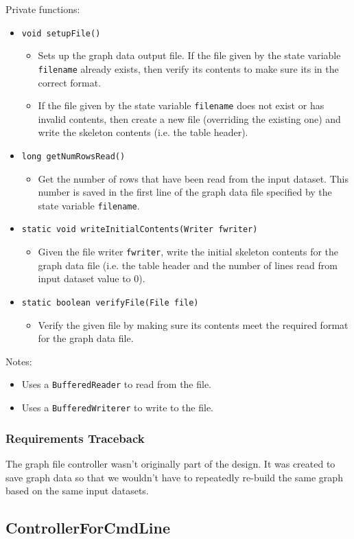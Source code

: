 \documentclass[12pt]{article}
\newcommand{\bi}{\begin{itemize}}
\newcommand{\ei}{\end{itemize}}
\newcommand{\code}[1]{\texttt{#1}}
\begin{document}
\noindent Private functions:
\bi
	\item \code{void setupFile()}
	\bi
		\item Sets up the graph data output file. If the file given by the state variable \code{filename} already exists, then verify its contents to make sure its in the correct format.
		\item If the file given by the state variable \code{filename} does not exist or has invalid contents, then create a new file (overriding the existing one) and write the skeleton contents (i.e. the table header). 
	\ei
	\item \code{long getNumRowsRead()}
	\bi
		\item Get the number of rows that have been read from the input dataset. This number is saved in the first line of the graph data file specified by the state variable \code{filename}. 
	\ei
	\item \code{static void writeInitialContents(Writer fwriter)}
	\bi
		\item Given the file writer \code{fwriter}, write the initial skeleton contents for the graph data file (i.e. the table header and the number of lines read from input dataset value to 0). 
	\ei
	\item \code{static boolean verifyFile(File file)}
	\bi
		\item Verify the given file by making sure its contents meet the required format for the graph data file. 
	\ei
\ei

\noindent Notes:

\bi
	\item Uses a \code{BufferedReader} to read from the file.
	\item Uses a \code{BufferedWriterer} to write to the file.
\ei

\subsubsection{Requirements Traceback}

The graph file controller wasn't originally part of the design. It was created to save graph data so that we wouldn't have to repeatedly re-build the same graph based on the same input datasets. 

\newpage

\subsection{ControllerForCmdLine}
\end{document}
